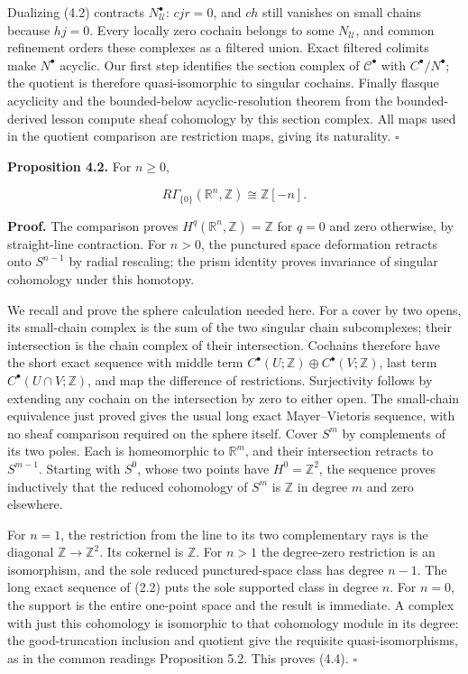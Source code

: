 \documentclass[
  english,
  11pt,
  a4paper,
]{article}
\begin{document}
Dualizing (4.2) contracts \(N_{\mathcal U}^\bullet\): \(cjr=0\), and
\(ch\) still vanishes on small chains because \(hj=0\). Every locally
zero cochain belongs to some \(N_{\mathcal U}\), and common refinement
orders these complexes as a filtered union. Exact filtered colimits make
\(N^\bullet\) acyclic. Our first step identifies the section complex of
\(\mathcal C^\bullet\) with \(C^\bullet/N^\bullet\); the quotient is
therefore quasi-isomorphic to singular cochains. Finally flasque
acyclicity and the bounded-below acyclic-resolution theorem from the
bounded-derived lesson compute sheaf cohomology by this section complex.
All maps used in the quotient comparison are restriction maps, giving
its naturality. \(\square\)

\textbf{Proposition 4.2.} For \(n\geq0\),

\[R\Gamma_{\{0\}}(\mathbb R^n,\mathbb Z)
\cong\mathbb Z[-n].
\tag{4.4}\]

\textbf{Proof.} The comparison proves
\(H^q(\mathbb R^n,\mathbb Z)=\mathbb Z\) for \(q=0\) and zero otherwise,
by straight-line contraction. For \(n>0\), the punctured space
deformation retracts onto \(S^{n-1}\) by radial rescaling; the prism
identity proves invariance of singular cohomology under this homotopy.

We recall and prove the sphere calculation needed here. For a cover by
two opens, its small-chain complex is the sum of the two singular chain
subcomplexes; their intersection is the chain complex of their
intersection. Cochains therefore have the short exact sequence with
middle term \(C^\bullet(U;\mathbb Z)\oplus C^\bullet(V;\mathbb Z)\),
last term \(C^\bullet(U\cap V;\mathbb Z)\), and map the difference of
restrictions. Surjectivity follows by extending any cochain on the
intersection by zero to either open. The small-chain equivalence just
proved gives the usual long exact Mayer--Vietoris sequence, with no
sheaf comparison required on the sphere itself. Cover \(S^m\) by
complements of its two poles. Each is homeomorphic to \(\mathbb R^m\),
and their intersection retracts to \(S^{m-1}\). Starting with \(S^0\),
whose two points have \(H^0=\mathbb Z^2\), the sequence proves
inductively that the reduced cohomology of \(S^m\) is \(\mathbb Z\) in
degree \(m\) and zero elsewhere.

For \(n=1\), the restriction from the line to its two complementary rays
is the diagonal \(\mathbb Z\to\mathbb Z^2\). Its cokernel is
\(\mathbb Z\). For \(n>1\) the degree-zero restriction is an
isomorphism, and the sole reduced punctured-space class has degree
\(n-1\). The long exact sequence of (2.2) puts the sole supported class
in degree \(n\). For \(n=0\), the support is the entire one-point space
and the result is immediate. A complex with just this cohomology is
isomorphic to that cohomology module in its degree: the good-truncation
inclusion and quotient give the requisite quasi-isomorphisms, as in the
common reading\textquotesingle s Proposition 5.2. This proves (4.4).
\(\square\)
\end{document}
